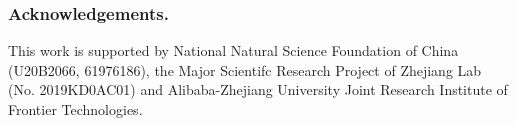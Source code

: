 \documentclass[letterpaper]{article} %
\begin{document}
\subsubsection{Acknowledgements.}
This work is supported by National Natural Science Foundation of China (U20B2066, 61976186), the Major Scientifc Research Project of Zhejiang Lab (No. 2019KD0AC01) and Alibaba-Zhejiang University Joint Research Institute of Frontier Technologies.




\end{document}

